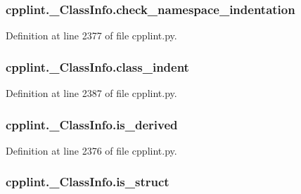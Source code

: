 \subsubsection[{\texorpdfstring{check\+\_\+namespace\+\_\+indentation}{check_namespace_indentation}}]{\setlength{\rightskip}{0pt plus 5cm}cpplint.\+\_\+\+Class\+Info.\+check\+\_\+namespace\+\_\+indentation}\hypertarget{classcpplint_1_1___class_info_a0ead95c17ac0b293d0d371eb7b414bd9}{}\label{classcpplint_1_1___class_info_a0ead95c17ac0b293d0d371eb7b414bd9}


Definition at line 2377 of file cpplint.\+py.

\subsubsection[{\texorpdfstring{class\+\_\+indent}{class_indent}}]{\setlength{\rightskip}{0pt plus 5cm}cpplint.\+\_\+\+Class\+Info.\+class\+\_\+indent}\hypertarget{classcpplint_1_1___class_info_adc7d328734cc58fe46a3a3f323a09f4a}{}\label{classcpplint_1_1___class_info_adc7d328734cc58fe46a3a3f323a09f4a}


Definition at line 2387 of file cpplint.\+py.

\subsubsection[{\texorpdfstring{is\+\_\+derived}{is_derived}}]{\setlength{\rightskip}{0pt plus 5cm}cpplint.\+\_\+\+Class\+Info.\+is\+\_\+derived}\hypertarget{classcpplint_1_1___class_info_a8cace481686fbbb35a1da552646aa9f4}{}\label{classcpplint_1_1___class_info_a8cace481686fbbb35a1da552646aa9f4}


Definition at line 2376 of file cpplint.\+py.

\subsubsection[{\texorpdfstring{is\+\_\+struct}{is_struct}}]{\setlength{\rightskip}{0pt plus 5cm}cpplint.\+\_\+\+Class\+Info.\+is\+\_\+struct}\hypertarget{classcpplint_1_1___class_info_a57b443f42838d73183921d661b6fe4ef}{}\label{classcpplint_1_1___class_info_a57b443f42838d73183921d661b6fe4ef}


